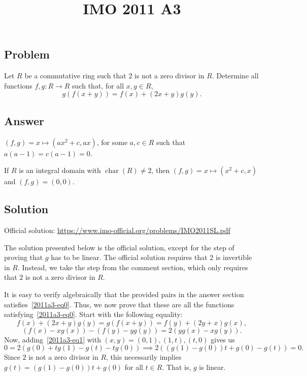 \documentclass{article}
\title{IMO 2011 A3}
\author{}
\date{}
\DeclareMathOperator{\rchar}{char}
\begin{document}
\maketitle



\subsection*{Problem}

Let $R$ be a commutative ring such that $2$ is not a zero divisor in $R$.
Determine all functions $f, g : R \to R$ such that, for all $x, y \in R$,
\[ g(f(x + y)) = f(x) + (2x + y) g(y). \tag{*}\label{2011a3-eq0} \]



\subsection*{Answer}

$(f, g) = x \mapsto (ax^2 + c, ax)$, for some $a, c \in R$ such that $a(a - 1) = c(a - 1) = 0$.

If $R$ is an integral domain with $\rchar(R) \neq 2$, then $(f, g) = x \mapsto (x^2 + c, x)$ and $(f, g) = (0, 0)$.



\subsection*{Solution}

Official solution: \url{https://www.imo-official.org/problems/IMO2011SL.pdf}

The solution presented below is the official solution, except for the step of proving that $g$ has to be linear.
The official solution requires that $2$ is invertible in $R$.
Instead, we take the step from the comment section, which only requires that $2$ is not a zero divisor in $R$.

It is easy to verify algebraically that the provided pairs in the answer section satisfies~\eqref{2011a3-eq0}.
Thus, we now prove that these are all the functions satisfying~\eqref{2011a3-eq0}.
Start with the following equality:
\[ f(x) + (2x + y) g(y) = g(f(x + y)) = f(y) + (2y + x) g(x), \]
\[ (f(x) - x g(x)) - (f(y) - y g(y)) = 2(y g(x) - x g(y)). \tag{1}\label{2011a3-eq1} \]
Now, adding~\eqref{2011a3-eq1} with $(x, y) = (0, 1), (1, t), (t, 0)$ gives us
\[ 0 = 2(g(0) + t g(1) - g(t) - t g(0)) \implies 2((g(1) - g(0)) t + g(0) - g(t)) = 0. \]
Since $2$ is not a zero divisor in $R$, this necessarily implies $g(t) = (g(1) - g(0)) t + g(0)$ for all $t \in R$.
That is, $g$ is linear.
\end{document}
